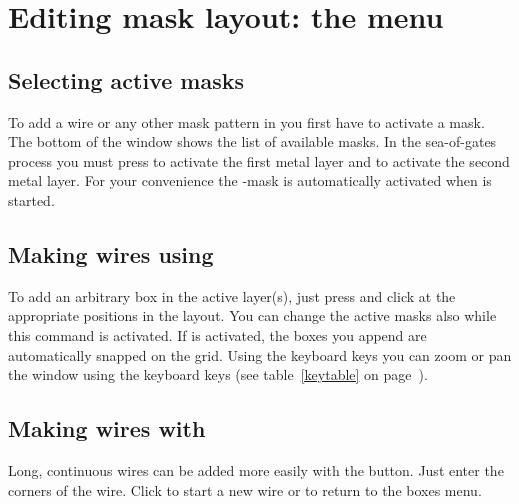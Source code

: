 \section{Editing mask layout: the \protect{} menu}
\subsection{Selecting active masks}
To add a wire or any other mask pattern in  you first
have to activate a mask.  
The bottom of the window shows the list of
available masks.  In the sea-of-gates process you must press
 to activate the first metal layer and 
to activate the second metal layer. For your convenience 
the -mask is automatically activated when 
 is started.

\subsection{Making wires using \protect{}}
To add an arbitrary box in the active layer(s), just press 
 and click at the appropriate positions in the 
layout. You can change the active masks also while this command is activated.
If  is activated,
 the boxes you
append are automatically snapped on the grid. Using the keyboard keys you can
zoom or pan the window using the keyboard keys (see table~\ref{keytable} on
page~\pageref{keytable}).

\subsection{Making wires with \protect{}}
Long, continuous wires can be added more easily with the 
button.  Just enter the corners of the wire. Click  to
start a new wire or  to return to the boxes menu.


